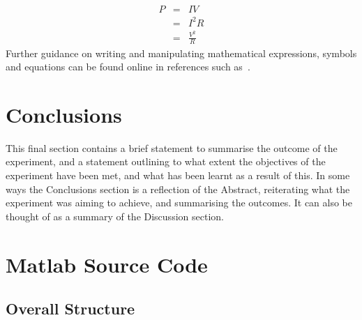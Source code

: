 \documentclass[11pt, a4paper]{article}
\begin{document}
\begin{eqnarray}
  P & = & I V             \\
    & = & I^2 R           \\
    & = & \frac{V^2}{R}
\label{eq:power}
\end{eqnarray}
Further guidance on writing and manipulating mathematical expressions, symbols and equations can be found online in references such as~\cite{ref:Maths}.

\section{Conclusions}

This final section contains a brief statement to summarise the outcome of the experiment, and a statement outlining to what extent the objectives of the experiment have been met, and what has been learnt as a result of this. In some ways the Conclusions section is a reflection of the Abstract, reiterating what the experiment was aiming to achieve, and summarising the outcomes. It can also be thought of as a summary of the Discussion section.

%






\newpage
\appendix
\appendixpage
\addappheadtotoc


\section{Matlab Source Code}

\subsection{Overall Structure}
\end{document}

